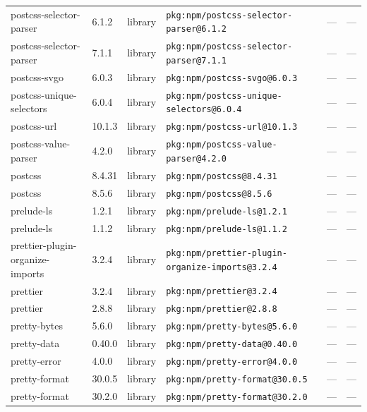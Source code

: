 \documentclass[11pt,a4paper]{article}
\begin{document}
\begin{longtable}{|p{4cm}|p{2cm}|p{1.6cm}|p{5cm}|p{1.5cm}|p{3.5cm}|}
\raggedright postcss-selector-parser & 6.1.2 & library & \small\texttt{pkg:npm/postcss-selector-parser@6.1.2} & — & \small — \\
\raggedright postcss-selector-parser & 7.1.1 & library & \small\texttt{pkg:npm/postcss-selector-parser@7.1.1} & — & \small — \\
\raggedright postcss-svgo & 6.0.3 & library & \small\texttt{pkg:npm/postcss-svgo@6.0.3} & — & \small — \\
\raggedright postcss-unique-selectors & 6.0.4 & library & \small\texttt{pkg:npm/postcss-unique-selectors@6.0.4} & — & \small — \\
\raggedright postcss-url & 10.1.3 & library & \small\texttt{pkg:npm/postcss-url@10.1.3} & — & \small — \\
\raggedright postcss-value-parser & 4.2.0 & library & \small\texttt{pkg:npm/postcss-value-parser@4.2.0} & — & \small — \\
\raggedright postcss & 8.4.31 & library & \small\texttt{pkg:npm/postcss@8.4.31} & — & \small — \\
\raggedright postcss & 8.5.6 & library & \small\texttt{pkg:npm/postcss@8.5.6} & — & \small — \\
\raggedright prelude-ls & 1.2.1 & library & \small\texttt{pkg:npm/prelude-ls@1.2.1} & — & \small — \\
\raggedright prelude-ls & 1.1.2 & library & \small\texttt{pkg:npm/prelude-ls@1.1.2} & — & \small — \\
\raggedright prettier-plugin-organize-imports & 3.2.4 & library & \small\texttt{pkg:npm/prettier-plugin-organize-imports@3.2.4} & — & \small — \\
\raggedright prettier & 3.2.4 & library & \small\texttt{pkg:npm/prettier@3.2.4} & — & \small — \\
\raggedright prettier & 2.8.8 & library & \small\texttt{pkg:npm/prettier@2.8.8} & — & \small — \\
\raggedright pretty-bytes & 5.6.0 & library & \small\texttt{pkg:npm/pretty-bytes@5.6.0} & — & \small — \\
\raggedright pretty-data & 0.40.0 & library & \small\texttt{pkg:npm/pretty-data@0.40.0} & — & \small — \\
\raggedright pretty-error & 4.0.0 & library & \small\texttt{pkg:npm/pretty-error@4.0.0} & — & \small — \\
\raggedright pretty-format & 30.0.5 & library & \small\texttt{pkg:npm/pretty-format@30.0.5} & — & \small — \\
\raggedright pretty-format & 30.2.0 & library & \small\texttt{pkg:npm/pretty-format@30.2.0} & — & \small — \\

\end{longtable}
\end{document}
